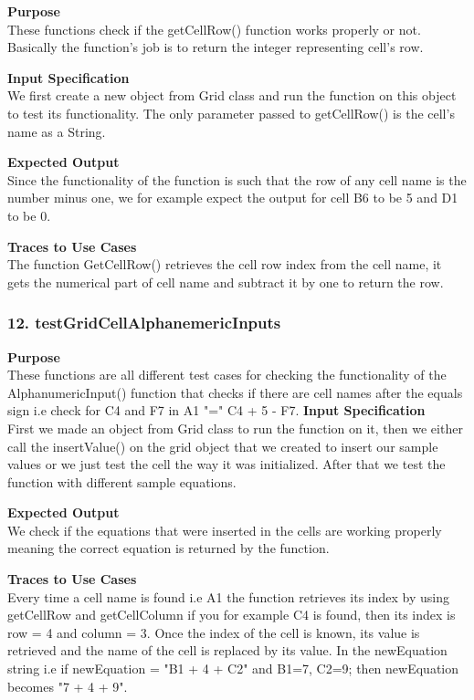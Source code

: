 \documentclass[12pt]{article}
\begin{document}
\noindent
{\bf Purpose}\\
These functions check if the getCellRow() function works properly or not. Basically the function’s job is to return the integer representing cell’s row.

\noindent
{\bf Input Specification}\\
We first create a new object from Grid class and run the function on this object to test its functionality. The only parameter passed to getCellRow() is the cell’s name as a String.

\noindent
{\bf Expected Output}\\
Since the functionality of the function is such that the row of any cell name is the number minus one, we for example expect the output for cell B6 to be 5 and D1 to be 0.

\noindent
{\bf Traces to Use Cases}\\
The function GetCellRow() retrieves the cell row index from the cell name, it gets the numerical part of cell name and subtract it by one to return the row.
\subsubsection{12. testGridCellAlphanemericInputs} \label{tc:1}

\noindent
{\bf Purpose}\\
These functions are all different test cases for checking the functionality of the AlphanumericInput() function that checks if there are cell names after the equals sign i.e check for C4 and F7 in A1 "=" C4 + 5 - F7.
\noindent
{\bf Input Specification}\\
First we made an object from Grid class to run the function on it, then we either call the insertValue() on the grid object that we created to insert our sample values or we just test the cell the way it was initialized. After that we test the function with different sample equations.

\noindent
{\bf Expected Output}\\
We check if the equations that were inserted in the cells are working properly meaning the correct equation is returned by the function.

\noindent
{\bf Traces to Use Cases}\\
Every time a cell name is found  i.e A1 the function retrieves its index by using getCellRow and getCellColumn if you for example C4 is found,  then its index is row = 4 and column = 3. Once the index of the cell is known, its value is retrieved and the name of the cell is replaced by its value. In the newEquation string i.e if newEquation = "B1 + 4 + C2" and B1=7, C2=9; then newEquation becomes "7 + 4 + 9".
\end{document}

